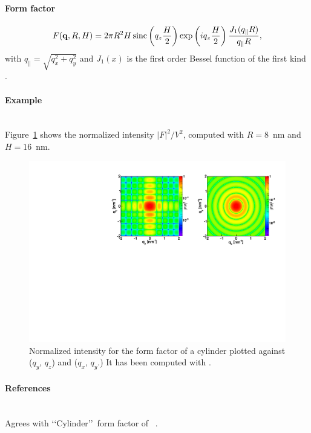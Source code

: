 \paragraph{Form factor}
  \begin{equation*}
F(\mathbf{q},R, H)=  2\pi
 R^2 H  \operatorname{sinc}\left(q_ z \frac{H}{2}\right) \exp\left(i q_ z \frac{H}{2}\right) \frac{J_1(q_{\parallel} R )}{q_{\parallel} R },
 \end{equation*}
with $q_{\parallel}=\sqrt{q_x^2+q_y^2}$ and $J_1(x)$ is the first order
Bessel function of the first kind \cite{AbSt64}.


\paragraph{Example}\strut\\
Figure~\ref{fig:FFcylinderEx} shows the normalized intensity
$|F|^2/V^2$, computed with $R=8$~nm and \mbox{$H=16$~nm.}
\begin{figure}[h]
\begin{center}
\includegraphics[angle=-90,width=\textwidth]{fig/ff/figffcylinder.pdf}
\end{center}
\caption{Normalized intensity for the form factor of a cylinder plotted against ($q_y$, $q_z$) and  ($q_x$, $q_y$.) It
has been  computed with .}
\label{fig:FFcylinderEx}
\end{figure}

\paragraph{References}\strut\\
Agrees with \lq\lq Cylinder\rq\rq\ form factor of \IsGISAXS~\cite{Laz02}.

